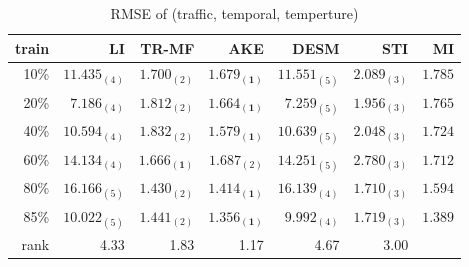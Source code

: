 \begin{table} [htbp]
\setlength{\tabcolsep}{2pt}
\centering
\caption{RMSE of (traffic, temporal, temperture)}
\label{table:traffic_temporal_tem}
\begin{tabular}{ r | r r r r r r}
	train	&LI	&TR-MF	&AKE	&DESM	&STI &MI\\ \hline
	10\% & $ 11.435_{(4)} $ & $ 1.700_{(2)} $ & $ \mathbf{ 1.679_{(1)} } $ & $ 11.551_{(5)} $ & $ 2.089_{(3)} $ &$1.785$\\
	20\% & $ 7.186_{(4)} $ & $ 1.812_{(2)} $ & $ \mathbf{ 1.664_{(1)} } $ & $ 7.259_{(5)} $ & $ 1.956_{(3)} $ &$1.765$\\
	40\% & $ 10.594_{(4)} $ & $ 1.832_{(2)} $ & $ \mathbf{ 1.579_{(1)} } $ & $ 10.639_{(5)} $ & $ 2.048_{(3)} $& $1.724$\\
	60\% & $ 14.134_{(4)} $ & $ \mathbf{ 1.666_{(1)} } $ & $ 1.687_{(2)} $ & $ 14.251_{(5)} $ & $ 2.780_{(3)} $ &$1.712$\\
	80\% & $ 16.166_{(5)} $ & $ 1.430_{(2)} $ & $ \mathbf{ 1.414_{(1)} } $ & $ 16.139_{(4)} $ & $ 1.710_{(3)} $ &$1.594$\\
	85\% & $ 10.022_{(5)} $ & $ 1.441_{(2)} $ & $ \mathbf{ 1.356_{(1)} } $ & $ 9.992_{(4)} $ & $ 1.719_{(3)} $ &$1.389$\\ \hline
	rank &4.33 &1.83 &1.17 &4.67 &3.00 \\
\end{tabular}
\end{table}

